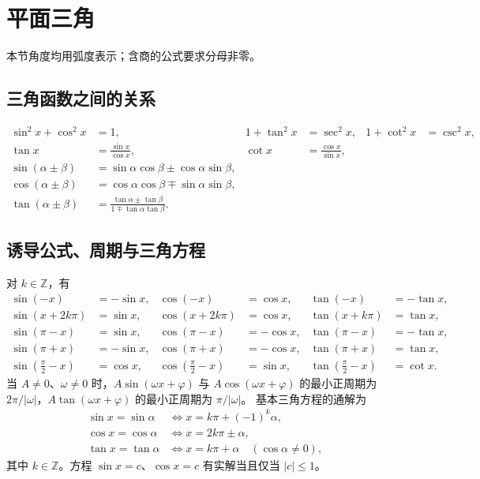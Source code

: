 \documentclass[../main.tex]{subfiles}
\begin{document}
\section{平面三角}
本节角度均用弧度表示；含商的公式要求分母非零。
\subsection{三角函数之间的关系}
\begin{align*}
\sin^2x+\cos^2x&=1, & 1+\tan^2x&=\sec^2x, & 1+\cot^2x&=\csc^2x,\\
\tan x&=\frac{\sin x}{\cos x}, & \cot x&=\frac{\cos x}{\sin x},\\
\sin(\alpha\pm\beta)&=\sin\alpha\cos\beta\pm\cos\alpha\sin\beta,\\
\cos(\alpha\pm\beta)&=\cos\alpha\cos\beta\mp\sin\alpha\sin\beta,\\
\tan(\alpha\pm\beta)&=\frac{\tan\alpha\pm\tan\beta}{1\mp\tan\alpha\tan\beta}.
\end{align*}
\subsection{诱导公式、周期与三角方程}
对 $k\in\mathbb Z$，有
\begin{align*}
\sin(-x)&=-\sin x, & \cos(-x)&=\cos x, & \tan(-x)&=-\tan x,\\
\sin(x+2k\pi)&=\sin x, & \cos(x+2k\pi)&=\cos x, & \tan(x+k\pi)&=\tan x,\\
\sin(\pi-x)&=\sin x, & \cos(\pi-x)&=-\cos x, & \tan(\pi-x)&=-\tan x,\\
\sin(\pi+x)&=-\sin x, & \cos(\pi+x)&=-\cos x, & \tan(\pi+x)&=\tan x,\\
\sin\left(\frac\pi2-x\right)&=\cos x, &
\cos\left(\frac\pi2-x\right)&=\sin x, &
\tan\left(\frac\pi2-x\right)&=\cot x.
\end{align*}
当 $A\ne0$、$\omega\ne0$ 时，$A\sin(\omega x+\varphi)$ 与 $A\cos(\omega x+\varphi)$ 的最小正周期为 $2\pi/|\omega|$，$A\tan(\omega x+\varphi)$ 的最小正周期为 $\pi/|\omega|$。
基本三角方程的通解为
\begin{align*}
\sin x=\sin\alpha&\iff x=k\pi+(-1)^k\alpha,\\
\cos x=\cos\alpha&\iff x=2k\pi\pm\alpha,\\
\tan x=\tan\alpha&\iff x=k\pi+\alpha\quad(\cos\alpha\ne0),
\end{align*}
其中 $k\in\mathbb Z$。方程 $\sin x=c$、$\cos x=c$ 有实解当且仅当 $|c|\le1$。
\end{document}
